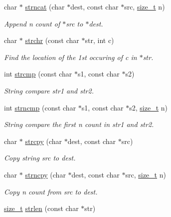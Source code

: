 \begin{DoxyCompactItemize}
char $\ast$ \mbox{\hyperlink{a00071_a0aee928c2844a269966e4832fd2255c5}{strncat}} (char $\ast$dest, const char $\ast$src, \mbox{\hyperlink{a00074_a43b4547e12226fef871eed8afe191ad7}{size\+\_\+t}} n)
\begin{DoxyCompactList}\small\item\em Append n count of $\ast$src to $\ast$dest. \end{DoxyCompactList}\item 
char $\ast$ \mbox{\hyperlink{a00071_afcd97f487174f9092b0f23c7ac78a55a}{strchr}} (const char $\ast$str, int c)
\begin{DoxyCompactList}\small\item\em Find the location of the 1st occuring of c in $\ast$str. \end{DoxyCompactList}\item 
int \mbox{\hyperlink{a00071_a11bd144d7d44914099a3aeddf1c8567d}{strcmp}} (const char $\ast$s1, const char $\ast$s2)
\begin{DoxyCompactList}\small\item\em String compare str1 and str2. \end{DoxyCompactList}\item 
int \mbox{\hyperlink{a00071_a07f4a84c11c106e95c32b6ab509346ef}{strncmp}} (const char $\ast$s1, const char $\ast$s2, \mbox{\hyperlink{a00074_a43b4547e12226fef871eed8afe191ad7}{size\+\_\+t}} n)
\begin{DoxyCompactList}\small\item\em String compare the first n count in str1 and str2. \end{DoxyCompactList}\item 
char $\ast$ \mbox{\hyperlink{a00071_a7a82515b5d377be04817715c5465b647}{strcpy}} (char $\ast$dest, const char $\ast$src)
\begin{DoxyCompactList}\small\item\em Copy string src to dest. \end{DoxyCompactList}\item 
char $\ast$ \mbox{\hyperlink{a00071_a47d54f24198df56da51078a6c540b9ed}{strncpy}} (char $\ast$dest, const char $\ast$src, \mbox{\hyperlink{a00074_a43b4547e12226fef871eed8afe191ad7}{size\+\_\+t}} n)
\begin{DoxyCompactList}\small\item\em Copy n count from src to dest. \end{DoxyCompactList}\item 
\mbox{\hyperlink{a00074_a43b4547e12226fef871eed8afe191ad7}{size\+\_\+t}} \mbox{\hyperlink{a00071_a008e171a518fe0e0352f31b245e03875}{strlen}} (const char $\ast$str)

\end{DoxyCompactItemize}
